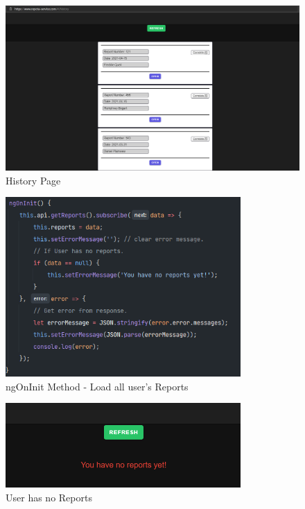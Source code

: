 \begin{figure}[H]
    \caption{History Page}
    \label{image:historyPage}
    \centering
    \includegraphics[width=1.0\textwidth]{images/repota/UI/history-page.png}
\end{figure}

\begin{figure}[H]
    \caption{ngOnInit Method - Load all user's Reports}
    \label{image:get_reports}
    \centering
    \includegraphics[width=0.8\textwidth]{images/repota/report_pages/get_reports.png}
\end{figure}

\begin{figure}[H]
    \caption{User has no Reports}
    \label{image:noReports}
    \centering
    \includegraphics[width=0.8\textwidth]{images/repota/UI/no_reports.png}
\end{figure}


